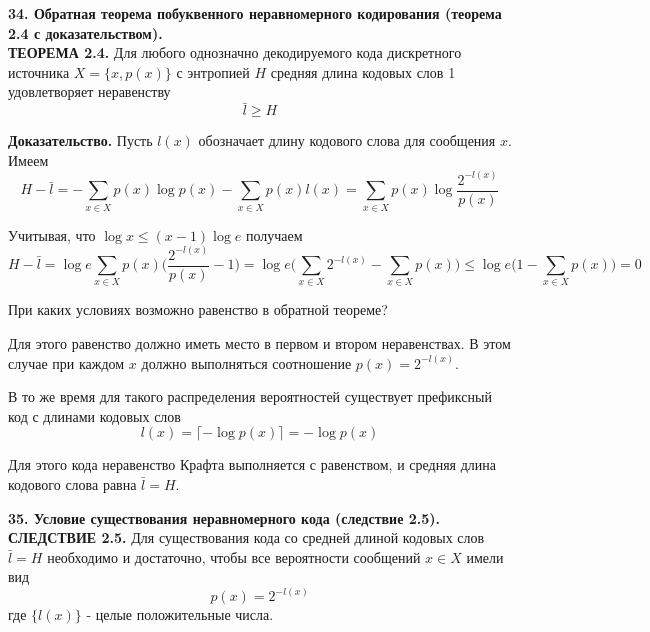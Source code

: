 \documentclass[14pt]{article}
\begin{document}
\bigskip
\textbf{34. Обратная теорема побуквенного неравномерного кодирования (теорема 2.4 с доказательством).} \\

\textbf{ТЕОРЕМА 2.4.} Для любого однозначно декодируемого кода дискретного источника \(X = \{x,p(x)\}\) с энтропией \(H\) средняя длина кодовых слов 1 удовлетворяет неравенству
\begin{displaymath}
    \bar{l} \geq H
\end{displaymath}

\textbf{Доказательство.} Пусть \(l(x)\) обозначает длину кодового слова для сообщения \(x\). Имеем
\begin{displaymath}
    H - \bar{l} = -\sum_{x \in X} p(x)\log p(x) - \sum_{x \in X} p(x) l(x) = \sum_{x \in X} p(x) \log \frac{2^{-l(x)}}{p(x)}
\end{displaymath}

Учитывая, что \(\log x \leq (x - 1)\log e\) получаем
\begin{displaymath}
    H - \bar{l} = \log e \sum_{x \in X} p(x) \Big(\frac{2^{-l(x)}}{p(x)} - 1\Big) = \log e \Big(\sum_{x \in X} 2^{-l(x)} - \sum_{x \in X} p(x)\Big) \leq \log e \Big(1 - \sum_{x \in X} p(x)\Big) = 0
\end{displaymath}

При каких условиях возможно равенство в обратной теореме?

Для этого равенство должно иметь место в первом и втором неравенствах. В этом случае при каждом \(x\) должно выполняться соотношение \(p(x) = 2^{-l(x)}\).

В то же время для такого распределения вероятностей существует префиксный код с длинами кодовых слов
\begin{displaymath}
    l(x) = \lceil -\log p(x) \rceil = -\log p(x)
\end{displaymath}

Для этого кода неравенство Крафта выполняется с равенством, и средняя длина кодового слова равна \(\bar{l} = H\).

\bigskip
\textbf{35. Условие существования неравномерного кода (следствие 2.5).} \\

\textbf{СЛЕДСТВИЕ 2.5.} Для существования кода со средней длиной кодовых слов \(\bar{l} = H\) необходимо и достаточно, чтобы все вероятности сообщений \(x \in X\) имели вид
\begin{displaymath}
    p(x) = 2^{-l(x)}
\end{displaymath}
где \(\{l(x)\}\) - целые положительные числа.
\end{document}
